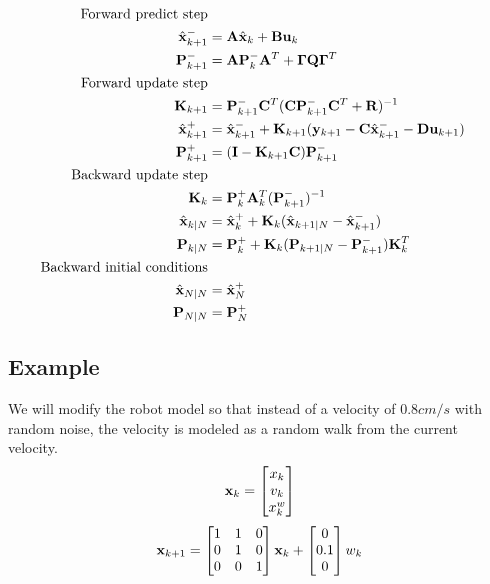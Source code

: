 \begin{theorem}
  \label{thm:kalman_smoother}
  \begin{align}
    \text{Forward predict step} \nonumber \\
    \hat{\mathbf{x}}_{k+1}^- &= \mathbf{A}\hat{\mathbf{x}}_k + \mathbf{B} \mathbf{u}_k \\
    \mathbf{P}_{k+1}^- &= \mathbf{A} \mathbf{P}_k^- \mathbf{A}^T +
      \mathbf{\Gamma}\mathbf{Q}\mathbf{\Gamma}^T \\
    \text{Forward update step} \nonumber \\
    \mathbf{K}_{k+1} &=
      \mathbf{P}_{k+1}^- \mathbf{C}^T (\mathbf{C}\mathbf{P}_{k+1}^- \mathbf{C}^T +
      \mathbf{R})^{-1} \\
    \hat{\mathbf{x}}_{k+1}^+ &=
      \hat{\mathbf{x}}_{k+1}^- + \mathbf{K}_{k+1}(\mathbf{y}_{k+1} -
      \mathbf{C} \hat{\mathbf{x}}_{k+1}^- - \mathbf{D}\mathbf{u}_{k+1}) \\
    \mathbf{P}_{k+1}^+ &= (\mathbf{I} - \mathbf{K}_{k+1}\mathbf{C})\mathbf{P}_{k+1}^- \\
    \text{Backward update step} \nonumber \\
    \mathbf{K}_k &= \mathbf{P}_k^+ \mathbf{A}_k^T (\mathbf{P}_{k+1}^-)^{-1} \\
    \hat{\mathbf{x}}_{k|N} &= \hat{\mathbf{x}}_k^+ +
      \mathbf{K}_k(\hat{\mathbf{x}}_{k+1|N} - \hat{\mathbf{x}}_{k+1}^-) \\
    \mathbf{P}_{k|N} &=
      \mathbf{P}_k^+ + \mathbf{K}_k(\mathbf{P}_{k+1|N} - \mathbf{P}_{k+1}^-)\mathbf{K}_k^T \\
    \text{Backward initial conditions} \nonumber \\
    \hat{\mathbf{x}}_{N|N} &= \hat{\mathbf{x}}_N^+ \\
    \mathbf{P}_{N|N} &= \mathbf{P}_N^+
  \end{align}
\end{theorem}

\subsection{Example}

We will modify the robot model so that instead of a velocity of $0.8 cm/s$ with
random noise, the velocity is modeled as a random walk from the current
velocity.
\begin{equation}
  \mathbf{x}_k =
  \begin{bmatrix}
    x_k \\
    v_k \\
    x_k^w
  \end{bmatrix}
\end{equation}
\begin{equation}
  \mathbf{x}_{k+1} =
  \begin{bmatrix}
    1 & 1 & 0 \\
    0 & 1 & 0 \\
    0 & 0 & 1
  \end{bmatrix} \mathbf{x}_k +
  \begin{bmatrix}
    0 \\
    0.1 \\
    0
  \end{bmatrix} w_k
\end{equation}

